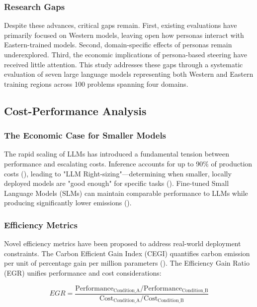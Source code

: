 \documentclass{article}
\begin{document}
\subsubsection{Research Gaps}

Despite these advances, critical gaps remain. First, existing evaluations have primarily focused on Western models, leaving open how personas interact with Eastern-trained models. Second, domain-specific effects of personas remain underexplored. Third, the economic implications of persona-based steering have received little attention. This study addresses these gaps through a systematic evaluation of seven large language models representing both Western and Eastern training regions across 100 problems spanning four domains.

\subsection{Cost-Performance Analysis}

\subsubsection{The Economic Case for Smaller Models}

The rapid scaling of LLMs has introduced a fundamental tension between performance and escalating costs. Inference accounts for up to 90\% of production costs (\cite{francisco_dur_n_a28bb68b}), leading to "LLM Right-sizing"—determining when smaller, locally deployed models are "good enough" for specific tasks (\cite{jennifer_haase_36a334aa}). Fine-tuned Small Language Models (SLMs) can maintain comparable performance to LLMs while producing significantly lower emissions (\cite{anandita_garg_c5aff6a3,anuj_kumar_1c38e9e4}).

\subsubsection{Efficiency Metrics}

Novel efficiency metrics have been proposed to address real-world deployment constraints. The Carbon Efficient Gain Index (CEGI) quantifies carbon emission per unit of percentage gain per million parameters (\cite{anuj_kumar_1c38e9e4}). The Efficiency Gain Ratio (EGR) unifies performance and cost considerations:

\begin{equation}
EGR = \frac{\text{Performance}_{\text{Condition\_A}} / \text{Performance}_{\text{Condition\_B}}}{\text{Cost}_{\text{Condition\_A}} / \text{Cost}_{\text{Condition\_B}}}
\end{equation}
\end{document}
